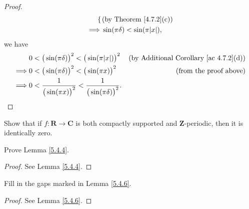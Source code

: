 \begin{proof}
\begin{align*}
\begin{cases}
        \end{cases}             & \text{(by Theorem \ref{4.7.2}(c))} \\
        \implies & \sin(\pi \delta) < \sin(\pi \abs*{x}),
    \end{align*}
    we have
    \begin{align*}
                 & 0 < \big(\sin(\pi \delta)\big)^2 < \big(\sin(\pi \abs*{x})\big)^2               & \text{(by Additional Corollary \ref{ac 4.7.2}(d))} \\
        \implies & 0 < \big(\sin(\pi \delta)\big)^2 < \big(\sin(\pi x)\big)^2                      & \text{(from the proof above)}                      \\
        \implies & 0 < \frac{1}{\big(\sin(\pi x)\big)^2} < \frac{1}{\big(\sin(\pi \delta)\big)^2}.
    \end{align*}
\end{proof}

\exercisesection

\begin{exercise}\label{ex 5.4.1}
    Show that if \(f : \mathbf{R} \to \mathbf{C}\) is both compactly supported and \(\mathbf{Z}\)-periodic, then it is identically zero.
\end{exercise}

\begin{exercise}\label{ex 5.4.2}
    Prove Lemma \ref{5.4.4}.
\end{exercise}

\begin{proof}
    See Lemma \ref{5.4.4}.
\end{proof}

\begin{exercise}\label{ex 5.4.3}
    Fill in the gaps marked in Lemma \ref{5.4.6}.
\end{exercise}

\begin{proof}
    See Lemma \ref{5.4.6}.
\end{proof}